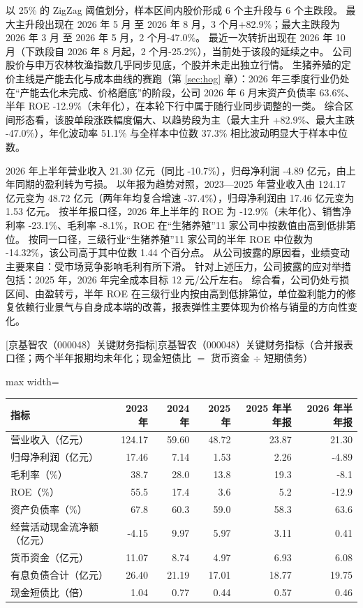  以 25\% 的 ZigZag 阈值划分，样本区间内股价形成 6 个主升段与 6 个主跌段。 最大主升段出现在 2026 年 5 月 至 2026 年 8 月，3 个月+82.9\%；最大主跌段为 2026 年 3 月 至 2026 年 5 月，2 个月-47.0\%。 最近一次转折出现在 2026 年 10 月（下跌段自 2026 年 8 月起，2 个月-25.2\%），当前处于该段的延续之中。 公司股价与申万农林牧渔指数几乎同步见底，个股并未走出独立行情。 生猪养殖的定价主线是产能去化与成本曲线的赛跑（第 \ref{sec:hog} 章）：2026 年三季度行业仍处在“产能去化未完成、价格磨底”的阶段，公司 2026 年 6 月末资产负债率 63.6\%、半年 ROE -12.9\%（未年化），在本轮下行中属于随行业同步调整的一类。 综合区间形态看，该股单段涨跌幅度偏大、以趋势段为主（最大主升 +82.9\%、最大主跌 -47.0\%），年化波动率 51.1\% 与全样本中位数 37.3\% 相比波动明显大于样本中位数。

 2026 年上半年营业收入 21.30 亿元（同比 -10.7\%），归母净利润 -4.89 亿元，由上年同期的盈利转为亏损。 以年报为趋势对照，2023---2025 年营业收入由 124.17 亿元变为 48.72 亿元（两年年均复合增速 -37.4\%），归母净利润由 17.46 亿元变为 1.53 亿元。 按半年报口径，2026 年上半年的 ROE 为 -12.9\%（未年化）、销售净利率 -23.1\%、毛利率 -8.1\%，ROE 在“生猪养殖”11 家公司中按数值由高到低排第位。 按同一口径，三级行业“生猪养殖”11 家公司的半年 ROE 中位数为 -14.32\%，该公司高于其中位数 1.44 个百分点。 从公司披露的原因看，业绩变动主要来自：受市场竞争影响毛利有所下滑。 针对上述压力，公司披露的应对举措包括：2025 年，2026 年完全成本目标 12 元/公斤左右。 综合看，公司仍处亏损区间、由盈转亏，半年 ROE 在三级行业内按由高到低排第位，单位盈利能力的修复依赖行业景气与自身成本端的改善，报表弹性主要体现为价格与销量的方向性变化。

\begin{center}\small\setlength{\tabcolsep}{3.4pt}
[京基智农（000048）关键财务指标]{京基智农（000048）关键财务指标（合并报表口径；两个半年报期均未年化；现金短债比 $=$ 货币资金 $\div$ 短期债务）}
\begin{adjustbox}{max width=\textwidth}
\begin{tabular}{@{}lrrrrr@{}}
\toprule
指标 & 2023 年 & 2024 年 & 2025 年 & 2025 年半年报 & 2026 年半年报 \\
\midrule
营业收入（亿元） & 124.17 & 59.60 & 48.72 & 23.87 & 21.30 \\
归母净利润（亿元） & 17.46 & 7.14 & 1.53 & 2.26 & -4.89 \\
毛利率（\%） & 38.7 & 28.0 & 13.8 & 19.3 & -8.1 \\
ROE（\%） & 55.5 & 17.4 & 3.6 & 5.2 & -12.9 \\
资产负债率（\%） & 67.8 & 60.3 & 59.0 & 58.3 & 63.6 \\
经营活动现金流净额（亿元） & -4.15 & 9.97 & 5.97 & 3.11 & 0.41 \\
货币资金（亿元） & 11.07 & 8.74 & 4.97 & 6.93 & 6.08 \\
有息负债合计（亿元） & 26.40 & 21.19 & 17.01 & 18.77 & 19.75 \\
现金短债比（倍） & 1.04 & 0.77 & 0.44 & 0.57 & 0.46 \\
\bottomrule
\end{tabular}
\end{adjustbox}
\end{center}

